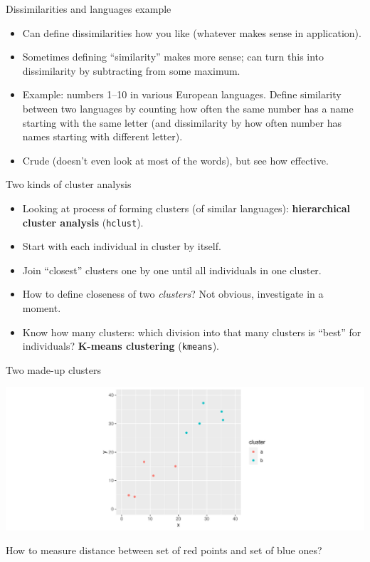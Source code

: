 \documentclass[
  ignorenonframetext,
]{beamer}
\begin{document}
\begin{frame}{Dissimilarities and languages example}
\protect\hypertarget{dissimilarities-and-languages-example}{}

\begin{itemize}
\item
  Can define dissimilarities how you like (whatever makes sense in
  application).
\item
  Sometimes defining ``similarity'' makes more sense; can turn this into
  dissimilarity by subtracting from some maximum.
\item
  Example: numbers 1--10 in various European languages. Define
  similarity between two languages by counting how often the same number
  has a name starting with the same letter (and dissimilarity by how
  often number has names starting with different letter).
\item
  Crude (doesn't even look at most of the words), but see how effective.
\end{itemize}

\end{frame}

\begin{frame}[fragile]{Two kinds of cluster analysis}
\protect\hypertarget{two-kinds-of-cluster-analysis}{}

\begin{itemize}
\item
  Looking at process of forming clusters (of similar languages):
  \textbf{hierarchical cluster analysis} (\texttt{hclust}).
\item
  Start with each individual in cluster by itself.
\item
  Join ``closest'' clusters one by one until all individuals in one
  cluster.
\item
  How to define closeness of two \emph{clusters}? Not obvious,
  investigate in a moment.
\item
  Know how many clusters: which division into that many clusters is
  ``best'' for individuals? \textbf{K-means clustering}
  (\texttt{kmeans}).
\end{itemize}

\end{frame}

\begin{frame}{Two made-up clusters}
\protect\hypertarget{two-made-up-clusters}{}

\includegraphics{slides_d29_files/figure-beamer/unnamed-chunk-352-1.pdf}

How to measure distance between set of red points and set of blue ones?

\end{frame}
\end{document}
